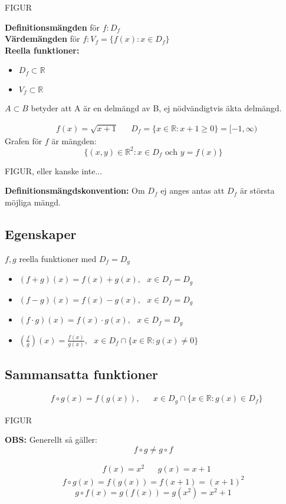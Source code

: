 \begin{center}
    FIGUR
\end{center}
\textbf{Definitionsmängden} för $f: D_f$\\
\textbf{Värdemängden} för $f: V_f = \{f(x): x \in D_f\}$ \\
\textbf{Reella funktioner:}
\begin{itemize}
    \item $D_f \subset \mathbb{R}$
    \item $V_f \subset \mathbb{R}$
\end{itemize}
$A \subset B$ betyder att A är en delmängd av B, ej nödvändigtvis äkta delmängd.
\begin{Ex}
    \begin{align}
        &f(x) = \sqrt{x + 1} && D_f = \{x \in \mathbb{R}: x+1 \ge 0\} = [-1,\infty)
    \end{align}
    Grafen för $f$ är mängden:
    \[
    \{(x,y) \in \mathbb{R}^2: x \in D_f \mbox{ och } y=f(x)\}
    \]
    \begin{center}
        FIGUR, eller kanske inte...
    \end{center}
\end{Ex}
\textbf{Definitionsmängdskonvention:} Om $D_f$ ej anges antas att $D_f$ är största möjliga mängd.

\subsection{Egenskaper} %
\label{sub:egeenskaper}
$f,g$ reella funktioner med $D_f = D_g$
\begin{itemize}
    \item $(f + g)(x) = f(x) + g(x), \mbox{ }x \in D_f = D_g$
    \item $(f - g)(x) = f(x) - g(x), \mbox{ }x \in D_f = D_g$
    \item $(f \cdot g)(x) = f(x) \cdot g(x), \mbox{ }x \in D_f = D_g$
    \item $(\frac{f}{g})(x) = \frac{f(x)}{g(x)}, \mbox{ } x \in D_f \cap \{x \in \mathbb{R}: g(x) \neq 0\}$
\end{itemize}
\subsection{Sammansatta funktioner} %
\label{sub:sammansatta_funktioner}
\begin{align*}
    &f \circ g(x) = f(g(x)), && x \in D_g \cap \{x \in \mathbb{R}: g(x) \in D_f\}
\end{align*}
\begin{center}
    FIGUR
\end{center}
\textbf{OBS:} Generellt så gäller: 
\[
f \circ g \neq g \circ f
\]
\begin{Ex}
    \begin{align}
        &f(x) = x^2 && g(x) = x + 1
    \end{align}
    \[
    f \circ g(x) = f(g(x)) = f(x + 1) = (x + 1)^2
    \]
    \[
    g \circ f(x) = g(f(x)) = g(x^2) = x^2 + 1
    \]
\end{Ex}

